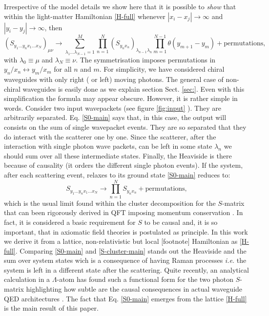 \documentclass[notitlepage, prx, preprint, amsmath,superscriptaddress,amssymb]{revtex4-1}
\begin{document}
 Irrespective of the  model details  we show here that  it is possible to \emph{show} that within the light-matter Hamiltonian \eqref{H-full} whenever $|x_i -x_j| \to \infty$ and $|y_i -y_j| \to \infty$, then
\begin{equation}
\label{S0-main}
( S_{y_1 ...y_n x_1...x_N} )_{\mu \nu} \to
\sum_{\lambda_1\dots \lambda_{N-1}=1}^M\prod_{n=1}^N (S_{y_nx_n})_{\lambda_{n-1}\lambda_n}
\prod_{m=1}^{N-1}\theta(y_{m+1}-y_m) + \text{permutations},
\end{equation}
with $\lambda_0\equiv \mu$ and $\lambda_N\equiv\nu$.  The symmetrisation imposes permutations in $y_n/x_n\leftrightarrow y_m/x_m$ for all $n$ and $m$.
For simplicity, we have considered chiral waveguides with only right ( or left) moving photons.   The general case of non-chiral waveguides is easily done as we explain section Sect. \ref{sec:}.   Even with this simplification  the formula may appear obscure.  However, it  is rather simple in words.   Consider  two input  wavepackets (see figure \ref{fig:input} ).  They are  {\color{red} arbitrarily separated}.  Eq. \eqref{S0-main} says that, in this case,  the output will consists on the sum of single wavepacket events.  They are so separated that they do interact with the scatterer {\color{red}one by one}.  Since the scatterer, after the interaction with single photon wave packets, can be left in some state $\lambda_n$ we should sum over all these intermediate states.  Finally, the Heaviside is there because of causality (it orders the different single photon events).   If the system, after each scattering event, relaxes to its ground state  \eqref{S0-main} reduces to:
\begin{equation}
\label{S-cluster-main}
 S_{y_1 ...y_n x_1...x_N}  \to \prod_{n=1}^N S_{y_nx_n}
+ \text{permutations},
\end{equation}
which is the usual limit  found within the cluster decomposition for the $S$-matrix that 
 can been  rigorously   derived in QFT  imposing momentum conservation \cite[Chap. 4]{weinberg1995}.  In fact, it is considered a basic requirement for $S$ to be causal and, it is so important, that in axiomatic field theories is postulated as principle.   In this work we derive it from a lattice, non-relativistic but local [footnote] Hamiltonian as \eqref{H-full}.  Comparing \eqref{S0-main} and \eqref{S-cluster-main} stands out the Heaviside and the sum over system states wich is a consequence of  having Raman processes \emph{i.e.} the system is left in a different state after the scattering.   
Quite recently, an analytical calculation in a  $\Lambda$-atom  has found such a functional form for the two photon $S$-matrix highlighting how subtle are the causal consequences in actual waveguide QED architectures \cite{Xu2016} .    The fact that Eq. \eqref{S0-main} emerges from the lattice \eqref{H-full} is the main result of this paper.
\end{document}
